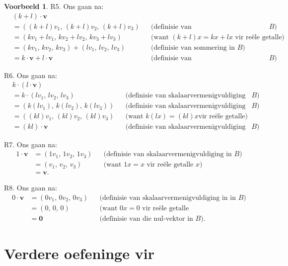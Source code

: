 \documentclass[a4paper,11pt]{book}
\theoremstyle{definition}
\newtheorem{example_environment}{Voorbeeld}[chapter]
\newcommand{\ve}[1]{\mathbf{#1}}
\newcommand{\furtherexercises}{\section*{Verdere oefeninge vir
\thesection}}
\newenvironment{example}
	{
		\begin{oframed}
		\begin{example_environment}
	}
	{
		\end{example_environment}
		\end{oframed}
	}
\begin{document}
\begin{example}
\noindent R5. Ons gaan na:
\begin{align*}
	& (k + l) \cdot \ve{v} \\
	&= ( (k+l) v_1, \, (k+l) v_2,  \, (k+l) v_3) && \mbox{(definisie van
	skalaarvermenigvuldiging in $B$)} \\
	&= (kv_1 + lv_1, \, kv_2 + lv_2, \, kv_3 + lv_3) && \mbox{(want $(k+l)x
	= kx + lx$ vir re{\"e}le getalle)} \\
	&= (kv_1, \, kv_2, \, kv_3) + (lv_1, \, lv_2, \, lv_3) &&
	\mbox{(definisie van sommering in $B$)} \\
	&= k \cdot \ve{v} + l \cdot \ve{v} && \mbox{(definisie van
	skalaarvermenigvuldiging in $B$)}
\end{align*}

\noindent R6. Ons gaan na:
\begin{align*}
	& k \cdot (l \cdot \ve{v}) \\
	&= k \cdot (l v_1, \, l v_2, \, lv_3) && \mbox{(definisie van
	skalaarvermenigvuldiging in $B$)} \\
	&= (k (lv_1), \, k (lv_2), \, k (lv_3)) && \mbox{(definisie van
	skalaarvermenigvuldiging in $B$)} \\
	&= ( (kl) v_1, \, (kl) v_2, \, (kl) v_3) && \mbox{(want $k(lx) = (kl)x$
	vir re{\"e}le getalle)} \\
	&= (kl) \cdot \ve{v} && \mbox{(definisie van skalaarvermenigvuldiging
	in $B$)}.
\end{align*}

\noindent R7. Ons gaan na:
\begin{align*}
	1 \cdot \ve{v} &= (1v_1, \, 1v_2, \, 1v_3) && \mbox{(definisie van
	skalaarvermenigvuldiging in $B$)} \\
	&= (v_1, \, v_2, \, v_3) && \mbox{(want $1 x = x$ vir re{\"e}le getalle
	$x$)} \\
	&= \ve{v}.
\end{align*}

\noindent R8. Ons gaan na:
\begin{align*}
	0 \cdot \ve{v} &= (0v_1, \, 0v_2, \, 0v_3) && \mbox{(definisie van
	skalaarvermenigvuldiging in in $B$)} \\
	&= (0, \, 0, \, 0) && \mbox{(want $0 x = 0$ vir re{\"e}le getalle} \\
	&= \ve{0} && \mbox{(definisie van die nul-vektor in $B$)}.
\end{align*}
\end{example}

\furtherexercises
\end{document}
